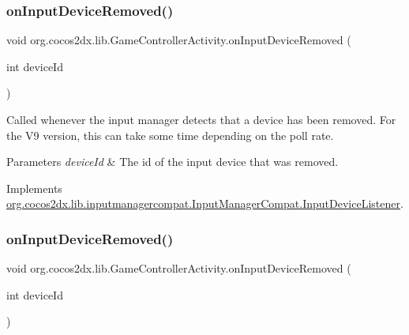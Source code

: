 \subsubsection{\texorpdfstring{on\+Input\+Device\+Removed()}{onInputDeviceRemoved()}\hspace{0.1cm}{\footnotesize\ttfamily [1/2]}}
{\footnotesize\ttfamily void org.\+cocos2dx.\+lib.\+Game\+Controller\+Activity.\+on\+Input\+Device\+Removed (\begin{DoxyParamCaption}\item[{int}]{device\+Id }\end{DoxyParamCaption})\hspace{0.3cm}{\ttfamily [inline]}}

Called whenever the input manager detects that a device has been removed. For the V9 version, this can take some time depending on the poll rate.


\begin{DoxyParams}{Parameters}
{\em device\+Id} & The id of the input device that was removed. \\
\hline
\end{DoxyParams}


Implements \hyperlink{interfaceorg_1_1cocos2dx_1_1lib_1_1inputmanagercompat_1_1InputManagerCompat_1_1InputDeviceListener_acc46e40fb1f8cf48e7e1d241f59e5461}{org.\+cocos2dx.\+lib.\+inputmanagercompat.\+Input\+Manager\+Compat.\+Input\+Device\+Listener}.

\mbox{\label{classorg_1_1cocos2dx_1_1lib_1_1GameControllerActivity_aec412cd3d3092fa8d9c0a90567062111}} 
\subsubsection{\texorpdfstring{on\+Input\+Device\+Removed()}{onInputDeviceRemoved()}\hspace{0.1cm}{\footnotesize\ttfamily [2/2]}}
{\footnotesize\ttfamily void org.\+cocos2dx.\+lib.\+Game\+Controller\+Activity.\+on\+Input\+Device\+Removed (\begin{DoxyParamCaption}\item[{int}]{device\+Id }\end{DoxyParamCaption})\hspace{0.3cm}{\ttfamily [inline]}}

